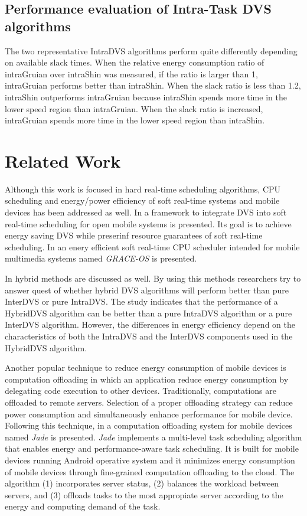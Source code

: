 \documentclass[10pt,article]{IEEEtran}
\begin{document}
\subsection{Performance evaluation of Intra-Task DVS algorithms}
The two representative IntraDVS algorithms perform quite differently depending on available slack times. When the relative energy consumption ratio of intraGruian over intraShin was measured, if the ratio is larger than 1, intraGruian performs better than intraShin. When  the  slack  ratio  is  less  than  1.2, intraShin outperforms intraGruian because intraShin spends more time in the lower speed region than intraGruian. When the slack ratio is increased, intraGruian spends more time in the lower speed region than intraShin.







\section{Related Work}
Although this work is focused in hard real-time scheduling algorithms, CPU scheduling and energy/power efficiency of soft real-time systems and mobile devices has been addressed as well. In \cite{yuan-nahrstedt-1} a framework to integrate DVS into soft real-time scheduling for open mobile systems is presented. Its goal is to achieve energy saving DVS while preserinf resource guarantees of soft real-time scheduling. In \cite{yuan-nahrstedt} an enery efficient soft real-time CPU scheduler intended for mobile multimedia systems named \emph{GRACE-OS} is presented.

In \cite{kim-2} hybrid methods are discussed as well. By using this methods researchers try to answer quest of whether hybrid DVS algorithms will perform better than pure InterDVS or pure IntraDVS. The study indicates that the performance of a HybridDVS algorithm can be better than a pure IntraDVS algorithm or a pure InterDVS algorithm. However, the differences in energy efficiency depend on the characteristics of both the IntraDVS and the InterDVS components used in the HybridDVS algorithm.

Another popular technique to reduce energy consumption of mobile devices is computation offloading in which an application reduce energy consumption by delegating code execution to other devices. Traditionally, computations are offloaded to remote servers. Selection of a proper offloading strategy can reduce power consumption and simultaneously enhance performance for mobile device. Following this technique, in \cite{quian-andresen} a computation offloading system for mobile devices named \emph{Jade} is presented. \emph{Jade} implements a multi-level task scheduling algorithm that enables energy and performance-aware task scheduling. It is built for mobile devices running Android operative system and it minimizes energy consumption of mobile devices through fine-grained computation offloading to the cloud. The algorithm (1) incorporates server status, (2) balances the workload between servers, and (3) offloads tasks to the most appropiate server according to the energy and computing demand of the task.
\end{document}
